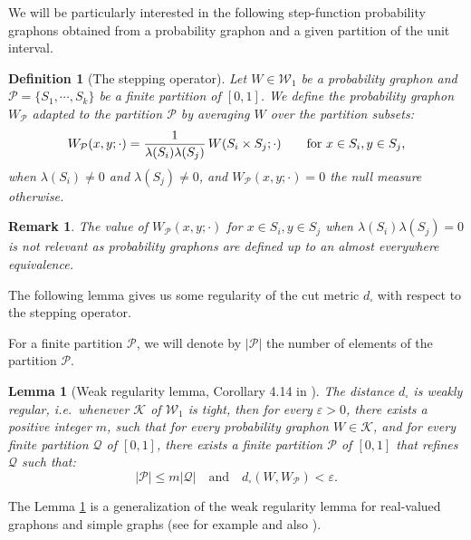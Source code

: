 \documentclass[11pt]{article}
\newtheorem{lemma}[theorem]{Lemma}
\newtheorem{definition}[theorem]{Definition}
\newtheorem{remark}[theorem]{Remark}
\newcommand{\cK}{{\mathcal K}}  %
\newcommand{\cP}{{\mathcal P}}  %
\newcommand{\Graphon}{\mathcal{W}_1}
\begin{document}
 We will be particularly interested in the following step-function probability graphons obtained from a probability graphon and a given partition of the unit interval. 
 
\begin{definition}[The stepping operator]
	\label{def_stepping_operator}
Let $W\in \Graphon$ be a probability graphon and  $\mathcal{P}=\{S_1,\cdots,S_k\}$ be a finite partition of $[0,1]$.
We define the probability graphon $W_\mathcal{P}$ adapted to the
partition  $\mathcal{P}$ by averaging $W$ over the partition subsets:
\[
  W_\mathcal{P}(x,y;\cdot) = \frac{1}{\lambda(S_i)\lambda(S_j)}\,
  W(S_i \times S_j;\cdot)
  \qquad \text{for $ x\in S_i, y\in S_j$,}
\]
when $\lambda(S_i)\neq 0$ and $\lambda(S_j)\neq 0$, and $W_\mathcal{P}(x,y;\cdot) = 0$ the null measure otherwise.
\end{definition}

\begin{remark}
The value of $ W_\mathcal{P}(x,y;\cdot)$ for  $ x\in
S_i, y\in S_j$ when $\lambda(S_i)\lambda(S_j)=0$ is not relevant as probability graphons are defined up to an almost everywhere equivalence. 
\end{remark}

The following lemma gives us some regularity of the cut metric $d_{\square}$ with respect to the stepping operator.

For a finite partition $\cP$, we will denote by $\vert\cP\vert$ the number of elements of the partition $\cP.$


\begin{lemma}
[Weak regularity lemma, Corollary 4.14 in \cite{abraham2023probabilitygraphons}]
  \label{LemmaWeakRegularity}
The distance $d_{\square}$ is weakly regular, i.e.\
 whenever $\cK$ of $ \Graphon$ is  tight,  then  for  every $\varepsilon   >  0$, there exists a positive integer $m$, such that for every probability graphon $W\in\cK$, and for every  finite partition $\mathcal{Q}$  of $[0,1]$,  there exists a  finite partition $\mathcal{P}$  of $[0,1]$  that  refines $\mathcal{Q}$ such that:
  \[
    \vert\mathcal{P}\vert  \leq m  \vert\mathcal{Q}\vert
    \quad\text{and}\quad
    d_{\square}(W, W_{\mathcal{P}}) < \varepsilon.
  \]

\end{lemma}

The Lemma \ref{LemmaWeakRegularity} is a generalization of the weak regularity lemma for real-valued graphons and simple graphs (see for example \cite[Lemma~9.15]{LovaszGraphLimits} and also \cite{Lovsz2007SzemerdisLF,fox2017regularity}).
\end{document}
